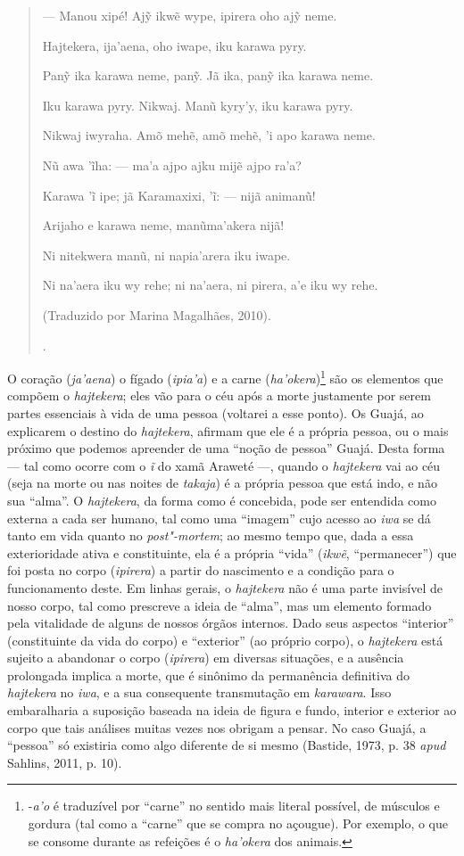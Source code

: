 \begin{quote}
{  --- Manou xipé! Ajỹ ikwẽ wype, ipirera oho ajỹ neme.

  Hajtekera, ija'aena, oho iwape, iku karawa pyry.

  Panỹ ika karawa neme, panỹ. Jã ika, panỹ ika karawa neme.

  Iku karawa pyry. Nikwaj. Manũ kyry'y, iku karawa pyry.

  Nikwaj iwyraha. Amõ mehẽ, amõ mehẽ, 'i apo karawa neme.

  Nũ awa 'ĩha: --- ma'a ajpo ajku mijẽ ajpo ra'a?

  Karawa 'ĩ ipe; jã Karamaxixi, 'ĩ: --- nijã animanũ!

  Arijaho e karawa neme, manũma'akera nijã!

  Ni nitekwera manũ, ni napia'arera iku iwape.

  Ni na'aera iku wy rehe; ni na'aera, ni pirera, a'e iku wy rehe.

  (Traduzido por Marina Magalhães, 2010).}.
\end{quote}

O coração (\emph{ja'aena}) o fígado (\emph{ipia'a}) e a carne
(\emph{ha'okera})\footnote{-\emph{a'o} é traduzível por ``carne'' no
  sentido mais literal possível, de músculos e gordura (tal como a
  ``carne'' que se compra no açougue). Por exemplo, o que se consome
  durante as refeições é o \emph{ha'okera} dos animais.} são os
elementos que compõem o \emph{hajtekera}; eles vão para o céu após a
morte justamente por serem partes essenciais à vida de uma pessoa
(voltarei a esse ponto). Os Guajá, ao explicarem o destino do
\emph{hajtekera}, afirmam que ele é a própria pessoa, ou o mais próximo
que podemos apreender de uma ``noção de pessoa'' Guajá. Desta forma --- tal
como ocorre com o \emph{ĩ} do xamã Araweté ---, quando o \emph{hajtekera}
vai ao céu (seja na morte ou nas noites de \emph{takaja}) é a própria
pessoa que está indo, e não sua ``alma''. O \emph{hajtekera}, da forma
como é concebida, pode ser entendida como externa a cada ser humano, tal
como uma ``imagem'' cujo acesso ao \emph{iwa} se dá tanto em vida quanto
no \emph{post"-mortem}; ao mesmo tempo que, dada a essa
exterioridade ativa e constituinte, ela é a própria ``vida'' (\emph{ikwẽ},
``permanecer'') que foi posta no corpo (\emph{ipirera}) a partir do
nascimento e a condição para o funcionamento deste. Em linhas gerais, o
\emph{hajtekera} não é uma parte invisível de nosso corpo, tal como
prescreve a ideia de ``alma'', mas um elemento formado pela vitalidade de
alguns de nossos órgãos internos. Dado seus aspectos ``interior''
(constituinte da vida do corpo) e ``exterior'' (ao próprio corpo), o
\emph{hajtekera} está sujeito a abandonar o corpo (\emph{ipirera}) em
diversas situações, e a ausência prolongada implica a morte, que é
sinônimo da permanência definitiva do \emph{hajtekera} no \emph{iwa}, e
a sua consequente transmutação em \emph{karawara}. Isso embaralharia a
suposição baseada na ideia de figura e fundo, interior e exterior ao
corpo que tais análises muitas vezes nos obrigam a pensar. No caso
Guajá, a ``pessoa'' só existiria como algo diferente de si mesmo (Bastide,
1973, p. 38 \emph{apud} Sahlins, 2011, p. 10).

